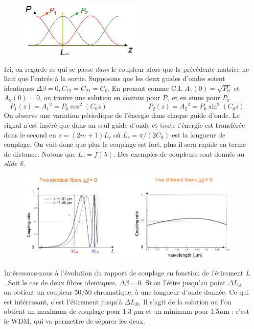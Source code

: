 	\begin{figure}
	\vspace{-10mm}
	\includegraphics[scale=0.75]{ch3/image3}
	\end{figure}
Ici, on regarde ce qui se passe \textit{dans} le coupleur alors que la précédente matrice ne liait que l'entrée à la sortie. Supposons que les deux guides d'ondes soient identiques $\Delta\beta=0,
C_{12}=C_{21}=C_0$.  En prenant comme C.I. $A_1(0) = \sqrt{P_0}$ et $A_2(0)=0$, on trouve une 
solution en cosinus pour $P_1$ et en sinus pour $P_2$
\begin{equation}
{P_1}(z) = {A_1}{^2} = {P_0}{\cos ^2}({C_0}z)\qquad\qquad\qquad
{P_2}(z) = {A_2}{^2} = {P_0}{\sin ^2}({C_0}z)
\end{equation}
On observe une variation périodique de l'énergie dans chaque guide d'onde. Le signal n'est inséré 
que dans un seul guide d'onde et toute l'énergie est transférée dans le second en 
$z=(2m+1)L_c$ où $L_c=\pi/(2C_0)$ est la longueur de couplage. On voit donc que plus le couplage
est fort, plus il sera rapide en terme de distance. Notons que $L_c = f(\lambda)$. Des exemples de
coupleurs sont donnés au \textit{slide 6}.\\


	\begin{figure}
	\vspace{-5mm}
	\includegraphics[scale=0.4]{ch3/image4}
	\end{figure}
Intéressons-nous à l'évolution du rapport de couplage en fonction de l'étirement $L$. Soit le cas
de deux fibres identiques, $\Delta\beta=0$. Si on l'étire jusqu'au point $\Delta L_A$ on obtient un
coupleur 50/50 chromatique, à une longueur d'onde donnée. Ce qui est intéressant, c'est l'étirement
jusqu'à $\Delta L_B$. Il s'agit de la solution ou l'on obtient un maximum de couplage pour 1.3 $\mu$m
et un minimum pour $1.5\mu$m : c'est le WDM, qui va permettre de séparer les deux.\\
 
